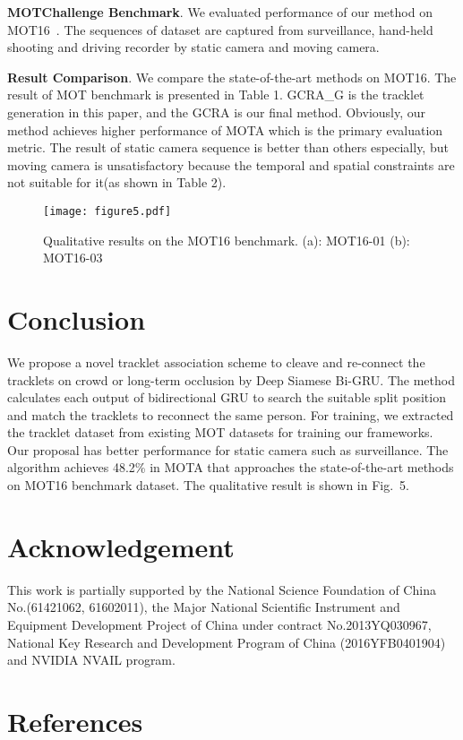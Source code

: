 \documentclass[5pt]{article}
\begin{document}
\noindent\textbf {MOTChallenge Benchmark}. We evaluated performance of our method on MOT16~\cite{DBLP:journals/corr/MilanL0RS16}. The sequences of dataset are captured from surveillance, hand-held shooting and driving recorder by static camera and moving camera.

\noindent\textbf {Result Comparison}. We compare the state-of-the-art methods on MOT16. The result of MOT benchmark is presented in Table 1. GCRA\_G is the tracklet generation in this paper, and the GCRA is our final method. Obviously, our method achieves higher performance of MOTA which is the primary evaluation metric. The result of static camera sequence is better than others especially, but moving camera is unsatisfactory because the temporal and spatial constraints are not suitable for it(as shown in Table 2).
\vspace{-0.3cm}
\begin{figure*}[t]
    \centering
    \texttt{[image: figure5.pdf]}
    \vspace{-0.5cm}
    \caption{Qualitative results on the MOT16 benchmark. (a): MOT16-01 (b): MOT16-03}
\vspace{-0.3cm}
\end{figure*}
\section{Conclusion}
\vspace{-0.1cm}
We propose a novel tracklet association scheme to cleave and re-connect the tracklets on crowd or long-term occlusion by Deep Siamese Bi-GRU. The method calculates each output of bidirectional GRU to search the suitable split position and match the tracklets to reconnect the same person. For training, we extracted the tracklet dataset from existing MOT datasets for training our frameworks. Our proposal has better performance for static camera such as surveillance. The algorithm achieves 48.2\% in MOTA that approaches the state-of-the-art methods on MOT16 benchmark dataset. The qualitative result is shown in Fig.\ 5.
\vspace{-0.3cm}
\section{Acknowledgement}
\vspace{-0.2cm}
This work is partially supported by the National Science Foundation of China No.(61421062, 61602011), the Major National Scientific Instrument and Equipment Development Project of China under contract No.2013YQ030967, National Key Research and Development Program of China (2016YFB0401904) and NVIDIA NVAIL program.
\vspace{-0.2cm}


\vspace{-0.2cm}
\section{References}
\renewcommand\refname{}
\vspace{-10.5mm}


\vspace{-0.2cm}
\end{document}
